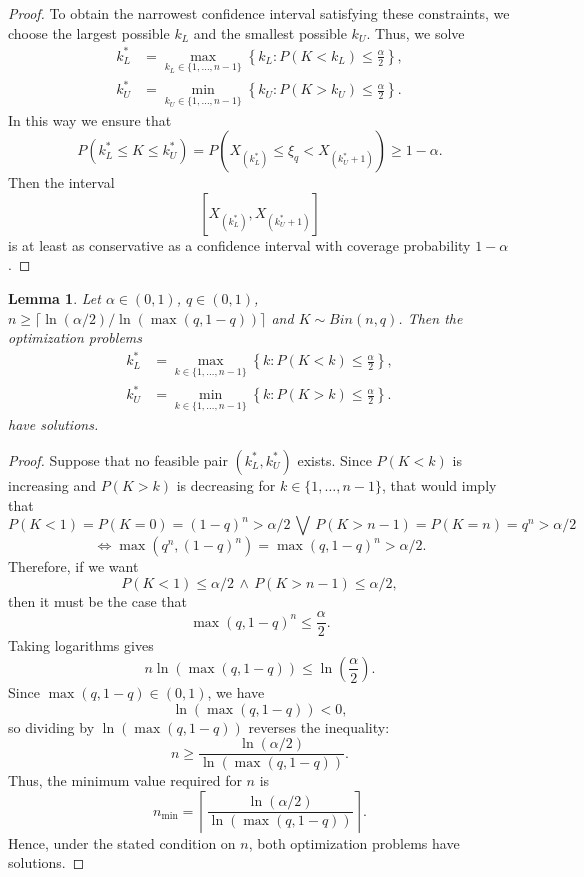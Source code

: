 \documentclass{article}
\newtheorem{lemma}{Lemma}
\begin{document}
\begin{proof}
To obtain the narrowest confidence interval satisfying these constraints, we choose the largest possible $k_L$ and the smallest possible $k_U$. Thus, we solve
$$
\begin{aligned}
k_L^*
&=
\max_{k_L\in\{1,\ldots,n-1\}}
\left\{
k_L:
P(K<k_L)\leq\frac{\alpha}{2}
\right\},\\
k_U^*
&=
\min_{k_U\in\{1,\ldots,n-1\}}
\left\{
k_U:
P(K>k_U)\leq\frac{\alpha}{2}
\right\}.
\end{aligned}
$$
In this way we ensure that
$$P(k_L^*\leq K \leq k_U^*)=P(X_{(k_L^*)}\leq \xi_q< X_{(k_U^*+1)})\geq 1-\alpha.$$
Then the interval
$$[X_{(k_L^*)},X_{(k_U^*+1)}]$$
is at least as conservative as a confidence interval with coverage probability $1-\alpha$.
\end{proof}

\begin{lemma}
Let $\alpha\in(0,1)$, $q\in(0,1)$, $n\geq\lceil\ln(\alpha/2)/\ln(\max (q, 1-q))\rceil$ and $K\sim Bin(n,q)$. Then the optimization problems
$$
\begin{aligned}
k_L^*
&=
\max_{k\in\{1,\ldots,n-1\}}
\left\{
k:
P(K<k)\leq\frac{\alpha}{2}
\right\},\\
k_U^*
&=
\min_{k\in\{1,\ldots,n-1\}}
\left\{
k:
P(K>k)\leq\frac{\alpha}{2}
\right\}.
\end{aligned}
$$
have solutions.
\end{lemma}
\begin{proof}
Suppose that no feasible pair $(k_L^*, k_U^*)$ exists. Since $P(K<k)$ is increasing and $P(K>k)$ is decreasing for $k\in\{1,\ldots,n-1\}$, that would imply that
$$
P(K<1)=P(K=0)=(1-q)^n>\alpha/2
\,\bigvee\,
P(K>n-1)=P(K=n)=q^n>\alpha/2
$$
$$
\Leftrightarrow
\max(q^n,(1-q)^n)=\max(q,1-q)^n>\alpha/2.
$$
Therefore, if we want
$$
P(K<1)\leq\alpha/2
\,\wedge\,
P(K>n-1)\leq\alpha/2,
$$
then it must be the case that
$$
\max(q,1-q)^n\leq \frac{\alpha}{2}.
$$
Taking logarithms gives
$$
n\ln(\max(q,1-q))
\leq
\ln\left(\frac{\alpha}{2}\right).
$$
Since $\max(q,1-q)\in(0,1)$, we have
$$
\ln(\max(q,1-q))<0,
$$
so dividing by $\ln(\max(q,1-q))$ reverses the inequality:
$$
n \geq \frac{\ln(\alpha/2)}{\ln(\max(q,1-q))}.
$$
Thus, the minimum value required for $n$ is
$$
n_\mathrm{min}
=
\left\lceil
\frac{\ln(\alpha/2)}
{\ln(\max(q,1-q))}
\right\rceil.
$$
Hence, under the stated condition on $n$, both optimization problems have solutions.
\end{proof}
\end{document}
